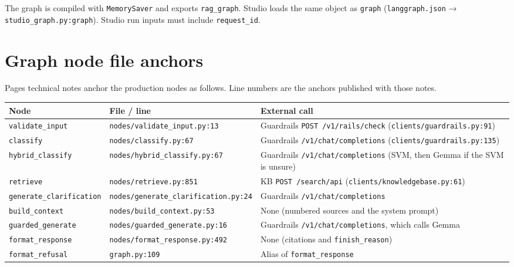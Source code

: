 The graph is compiled with \texttt{MemorySaver} and exports \texttt{rag\_graph}. Studio loads the same object as \texttt{graph} (\texttt{langgraph.json} → \texttt{studio\_graph.py:graph}). Studio run inputs must include \texttt{request\_id}.

\section{Graph node file anchors}\label{graph-node-file-anchors}

Pages technical notes anchor the production nodes as follows. Line numbers are the anchors published with those notes.

\begin{longtable}[]{@{}
  >{\raggedright\arraybackslash}p{}
  >{\raggedright\arraybackslash}p{}
  >{\raggedright\arraybackslash}p{}@{}}
\toprule\noalign{}
Node & File / line & External call \\
\midrule\noalign{}
\endhead
\bottomrule\noalign{}
\endlastfoot
\texttt{validate\_input} & \texttt{nodes/validate\_input.py:13} & Guardrails \texttt{POST\ /v1/rails/check} (\texttt{clients/guardrails.py:91}) \\
\texttt{classify} & \texttt{nodes/classify.py:67} & Guardrails \texttt{/v1/chat/completions} (\texttt{clients/guardrails.py:135}) \\
\texttt{hybrid\_classify} & \texttt{nodes/hybrid\_classify.py:67} & Guardrails \texttt{/v1/chat/completions} (SVM, then Gemma if the SVM is unsure) \\
\texttt{retrieve} & \texttt{nodes/retrieve.py:851} & KB \texttt{POST\ /search/api} (\texttt{clients/knowledgebase.py:61}) \\
\texttt{generate\_clarification} & \texttt{nodes/generate\_clarification.py:24} & Guardrails \texttt{/v1/chat/completions} \\
\texttt{build\_context} & \texttt{nodes/build\_context.py:53} & None (numbered sources and the system prompt) \\
\texttt{guarded\_generate} & \texttt{nodes/guarded\_generate.py:16} & Guardrails \texttt{/v1/chat/completions}, which calls Gemma \\
\texttt{format\_response} & \texttt{nodes/format\_response.py:492} & None (citations and \texttt{finish\_reason}) \\
\texttt{format\_refusal} & \texttt{graph.py:109} & Alias of \texttt{format\_response} \\
\end{longtable}

